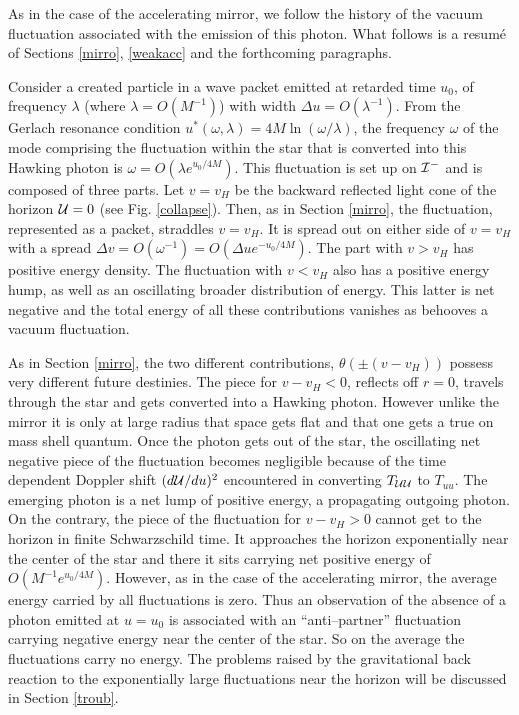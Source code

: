 \documentclass[12pt,oneside]{report}
\def\om{\omega	}
\def\la{\lambda}
\begin{document}
As in the case of the accelerating mirror, we follow the history of the
vacuum fluctuation associated with the emission of this photon. What
follows is a resum\'e of Sections \ref{mirro}, \ref{weakacc} and the forthcoming
paragraphs.

Consider a created particle in a wave packet emitted at retarded
time $u_0$, of frequency $\la$ (where
$\la=O(M^{-1})$) with width $\Delta u= O(\la^{-1})$. From the Gerlach
resonance condition $ u^*({\om,\la}) = 4 M \ln (\om/\la)$, the
frequency $\om$ of the mode comprising the fluctuation within the
star that is converted into this Hawking photon is $\om = O(\la e^{u_0/
4M})$. This fluctuation is set up on ${\cal I}^-$ and is composed of
three parts. Let $v=v_H$ be the backward reflected light cone of the
horizon ${\cal{U}}=0$ (see Fig. \ref{collapse}). Then, as in Section \ref{mirro}, the
fluctuation, represented as a packet, straddles $v=v_H$. It is spread out
on either side of $v=v_H$ with a spread $\Delta v =O(\om^{-1})=O(\Delta u
e^{-u_0/4M})$. The part with $v>v_H$ has positive energy density. The
fluctuation with $v<v_H$ also has a positive energy hump, as well as an
oscillating broader distribution of energy. This latter is net negative
and the total energy of all these contributions vanishes as behooves a
vacuum fluctuation.

As in Section \ref{mirro}, the two different contributions, $\theta(\pm
(v-v_H))$ possess very different future destinies. The piece for $v-v_H<0$,
reflects off $r=0$, travels through the star and gets converted into a
Hawking photon. However unlike the mirror it is only at large radius
that space gets flat and that one  gets a true on mass shell quantum. Once the photon gets
out of the star, the oscillating net negative piece of the fluctuation becomes negligible
because of the time dependent Doppler shift $(d{\cal{U}}/du)^2$  
encountered in converting $T_{{\cal{UU}}}$ to $T_{uu}$.
 The
emerging photon is a net lump of positive energy, a propagating
outgoing photon. On the contrary, the piece of the fluctuation for
$v-v_H>0$ cannot get to the horizon in finite Schwarzschild time. It
approaches the horizon exponentially near the center of the star and
there it sits carrying net positive energy of $O(M^{-1}e^{u_0/4M})$.
However, as in the case of the accelerating mirror, the average energy
carried by all fluctuations is zero. Thus an observation of the
absence of a photon emitted at $u=u_0$ is associated with an ``anti--partner''
fluctuation carrying negative energy near the center of the star. So
on the average the fluctuations carry no energy. 
The problems raised by the gravitational back reaction to the exponentially large
fluctuations near the horizon will be discussed in Section \ref{troub}.
\end{document}

